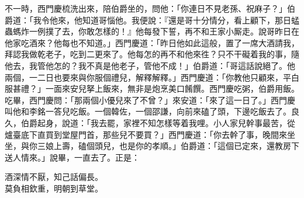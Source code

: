 不一時，西門慶梳洗出來，陪伯爵坐的，問他：「你連日不見老孫、祝麻子？」伯爵道：「我令他來，他知道哥惱他。我便說：『還是哥十分情分，看上顧下，那日蜢蟲螞炸一例撲了去，你敢怎樣的！』他每發下誓，再不和王家小厮走。說哥昨日在他家吃酒來？他每也不知道。」西門慶道：「昨日他如此這般，置了一席大酒請我，拜認我做乾老子，吃到二更來了。他每怎的再不和他來徃？只不干礙着我的事，隨他去，我管他怎的？我不真是他老子，管他不成！」{}伯爵道：「哥這話說絕了。他兩個，一二日也要來與你服個禮兒，解釋解釋。」西門慶道：「你教他只顧來，平白服甚禮？」一面來安兒拏上飯來，無非是炮烹美口餚饌。西門慶吃粥，伯爵用飯。吃畢，西門慶問：「那兩個小優兒來了不曾？」來安道：「來了這一日了。」西門慶叫他和李銘一答兒吃飯。一個韓佐，一個邵謙，向前來磕了頭，下邊吃飯去了。良久，伯爵起身，說道：「我去罷，家裡不知怎樣等着我哩。小人家兒幹事最苦，從爐臺底下直買到堂屋門首，那些兒不要買？」西門慶道：「你去幹了事，晚間來坐坐，與你三娘上壽，磕個頭兒，也是你的孝順。」伯爵道：「這個已定來，還教房下送人情來。」說畢，一直去了。正是：

\begin{myquote}
酒深情不厭，知己話偏長。\\莫負相欽重，明朝到草堂。
\end{myquote}

